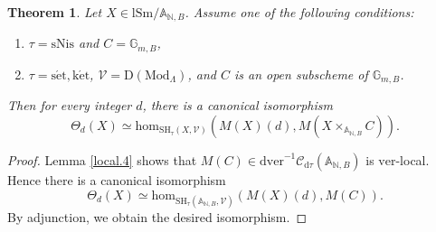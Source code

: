 \documentclass[10pt]{amsart}
\newtheorem{thm}{Theorem}[subsection]
\theoremstyle{definition}
\theoremstyle{remark}
\numberwithin{equation}{subsection}
\newcommand{\A}{\mathbb{A}}
\newcommand{\G}{\mathbb{G}}
\newcommand{\N}{\mathbb{N}}
\newcommand{\cV}{\mathcal{V}}
\newcommand{\sC}{\mathscr{C}}
\newcommand{\SH}{\mathrm{SH}}
\newcommand{\map}{\mathrm{hom}}
\newcommand{\DLambda}{\mathrm{D}(\mathrm{Mod}_{\Lambda})}
\newcommand{\lSm}{\mathrm{lSm}}
\newcommand{\ver}{\mathrm{ver}}
\newcommand{\dver}{\mathrm{dver}}
\newcommand{\dtau}{\mathrm{d}\tau}
\newcommand{\sNis}{\mathrm{sNis}}
\newcommand{\ketale}{\mathrm{k\acute{e}t}}
\newcommand{\setale}{\mathrm{s\acute{e}t}}
\begin{document}
\begin{thm}
\label{local.5}
Let $X\in \lSm/{\A_{\N,B}}$.
Assume one of the following conditions:
\begin{enumerate}
\item[\textup{(i)}]
$\tau=\sNis$ and $C=\G_{m,B}$,
\item[\textup{(ii)}]
$\tau=\setale,\ketale$, $\cV=\DLambda$, and $C$ is an open subscheme of $\G_{m,B}$.
\end{enumerate}
Then for every integer $d$,
there is a canonical isomorphism
\[
\Theta_d(X)
\simeq
\map_{\SH_{\tau}(X,\cV)}
(M(X)(d),M(X\times_{\A_{\N,B}}C)).
\]
\end{thm}
\begin{proof}
Lemma \ref{local.4} shows that $M(C)\in \dver^{-1}\sC_{\dtau}(\A_{\N,B})$ is $\ver$-local.
Hence there is a canonical isomorphism
\[
\Theta_d(X)
\simeq
\map_{\SH_{\tau}(\A_{\N,B},\cV)}
(M(X)(d),M(C)).
\]
By adjunction, we obtain the desired isomorphism.
\end{proof}
\end{document}
